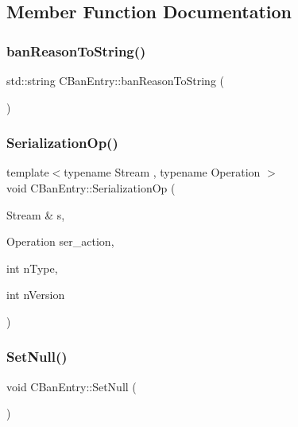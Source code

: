 \subsection{Member Function Documentation}
\mbox{\label{class_c_ban_entry_ada434bfaaa0ba57a7ad4c62cf5cbcda5}} 
\subsubsection{\texorpdfstring{ban\+Reason\+To\+String()}{banReasonToString()}}
{\footnotesize\ttfamily std\+::string C\+Ban\+Entry\+::ban\+Reason\+To\+String (\begin{DoxyParamCaption}{ }\end{DoxyParamCaption})\hspace{0.3cm}{\ttfamily [inline]}}

\mbox{\label{class_c_ban_entry_aba9cee585ab7313f54a9397e6c449732}} 
\subsubsection{\texorpdfstring{Serialization\+Op()}{SerializationOp()}}
{\footnotesize\ttfamily template$<$typename Stream , typename Operation $>$ \\
void C\+Ban\+Entry\+::\+Serialization\+Op (\begin{DoxyParamCaption}\item[{Stream \&}]{s,  }\item[{Operation}]{ser\+\_\+action,  }\item[{int}]{n\+Type,  }\item[{int}]{n\+Version }\end{DoxyParamCaption})\hspace{0.3cm}{\ttfamily [inline]}}

\mbox{\label{class_c_ban_entry_a7c2cd7c6ef6a7507c384697e46a23b2e}} 
\subsubsection{\texorpdfstring{Set\+Null()}{SetNull()}}
{\footnotesize\ttfamily void C\+Ban\+Entry\+::\+Set\+Null (\begin{DoxyParamCaption}{ }\end{DoxyParamCaption})\hspace{0.3cm}{\ttfamily [inline]}}



